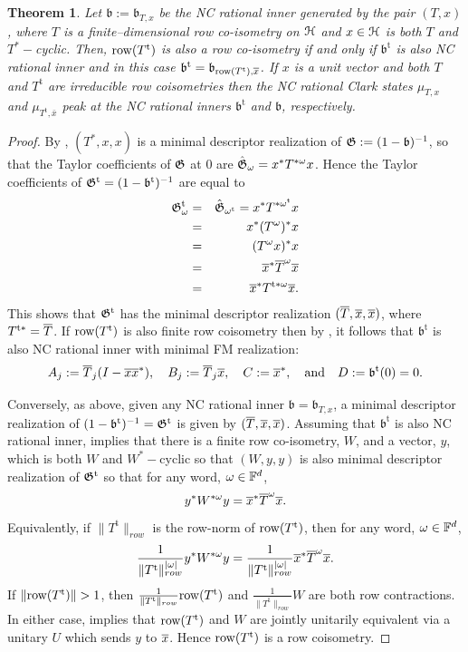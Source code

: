 \documentclass{article}
\newtheorem{thm}{Theorem}[section]
\theoremstyle{definition}
\theoremstyle{remark}
\numberwithin{equation}{section}
\def\ba{\begin{eqnarray*}}
\def\ea{\end{eqnarray*}}
\newcommand{\mr}{\ensuremath{\mathrm}}
\newcommand{\mf}{\ensuremath{\mathfrak}}
\newcommand{\ov}{\ensuremath{\overline}}
\newcommand{\om}{\ensuremath{\omega}}
\def\fb{\mathfrak{b}}
\def\fbt{\mathfrak{b} ^{\mathrm{t}}}
\def\mrt{\mathrm{t}}
\begin{document}
\begin{thm} \label{thm:qc}
Let $\fb := \fb _{T,x}$ be the NC rational inner generated by the pair $(T,x)$, where $T$ is a finite--dimensional row co-isometry on ${\mathcal H}$ and $x \in {\mathcal H}$ is both $T$ and $T^*-$cyclic. Then, $\mr{row} (T^\mrt)$ is also a row co-isometry if and only if $\fbt$ is also NC rational inner and in this case $\fbt = \fb _{\mr{row} (T^\mrt) , \ov{x}}$.  If $x$ is a unit vector and both $T$ and $T^\mrt$ are irreducible row coisometries then the NC rational Clark states $\mu _{T,x}$ and $\mu _{T ^\mrt , \bar{x}}$ peak at the NC rational inners $\fb ^\mrt$ and $\fb$, respectively.
\end{thm}

\begin{proof}
By \cite[Theorem 3.2, Remark 3.4]{JMS-ncratClark}, $(T^*,x,x)$ is a minimal descriptor realization of $\mf{G} := (1 - \fb ) ^{-1}$, so that the Taylor coefficients of $\mf{G}$ at $0$ are $\hat{\mf{G}} _\om = x^* T^{*\om} x$. Hence the Taylor coefficients of $\mf{G} ^\mrt = (1 - \fbt ) ^{-1}$ are equal to
\ba \mf{G} ^\mrt _\om & = & \hat{\mf{G}} _{\om ^\mrt} = x^* T ^{* \om ^\mrt} x  \\
& = & x^* (T^{\om}) ^* x  \\
& = & (T^\om x) ^* x \\ 
& = & \ov{x} ^* \ov{T} ^\om \ov{x} \\
& = & \ov{x} ^*  T^{\mrt * \om} \ov{x}. \ea 
This shows that $\mf{G} ^\mrt$ has the minimal descriptor realization $( \ov{T} , \ov{x} , \ov{x} )$, where $T^{\mrt *} = \ov{T}$. If $\mr{row} (T ^\mrt)$ is also finite row coisometry then by \cite[Theorem 4.1]{JMS-ncratClark}, it follows that $\fbt$ is also NC rational inner with minimal FM realization:
$$ A _j := \ov{T} _j (I-\ov{x}\ov{x}^*), \quad B_j := \ov{T} _j \ov{x}, \quad C := \ov{x}^*, \quad \mbox{and} \quad D:= \fbt (0) =0. $$

Conversely, as above, given any NC rational inner $\fb = \fb _{T,x}$, a minimal descriptor realization of $(1 - \fbt ) ^{-1} = \mf{G} ^\mrt$ is given by $(\ov{T}, \ov{x} , \ov{x} )$.  Assuming that $\fbt$ is also NC rational inner, \cite[Theorem 3.2, Remark 3.4]{JMS-ncratClark} implies that there is a finite row co-isometry, $W$, and a vector, $y$, which is both $W$ and $W^*-$cyclic so that $(W,y, y)$ is also minimal descriptor realization of $\mf{G} ^\mrt$ so that for any word, $\om \in \F ^d$, 
$$ y^* W ^{*\om} y = \ov{x} ^* \ov{T} ^\om \ov{x}. $$ 
Equivalently, if $\| T ^\mrt \| _{row}$ is the row-norm of $\mr{row} (T^\mrt )$, then for any word, $\om \in \F ^d$, 
$$ \frac{1}{\| T^\mrt  \| _{row} ^{| \om | } } y^* W ^{*\om} y =  \frac{1}{\| T^\mrt  \| _{row} ^{| \om | } } \ov{x} ^* \ov{T} ^\om \ov{x}. $$
If $\| \mr{row} (T ^\mrt ) \| > 1$, then $\frac{1}{\| T ^\mrt \|_{row} } \mr{row} (T ^\mrt )$ and $\frac{1}{\| T ^\mrt \| _{row}} W$ are both row contractions. In either case, \cite[Proposition 3.6, Lemma 3.9]{JMS-ncratClark} implies that $\mr{row} (T^\mrt )$ and $W$ are jointly unitarily equivalent via a unitary $U$ which sends $y$ to $\ov{x}$. Hence $\mr{row} (T^\mrt )$ is a row coisometry. 
\end{proof}
\end{document}
